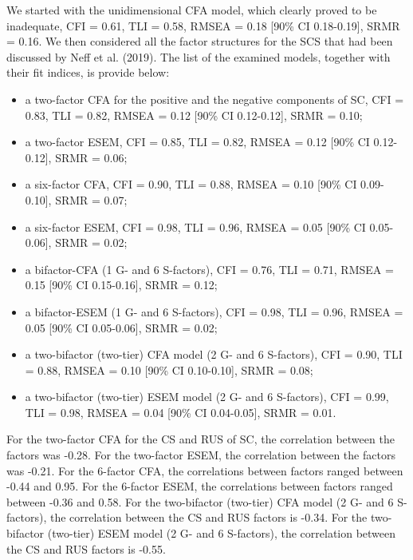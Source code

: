 \documentclass[
  english,
  man,floatsintext]{apa7}
\begin{document}
We started with the unidimensional CFA model, which clearly proved to be inadequate, CFI = 0.61, TLI = 0.58, RMSEA = 0.18 {[}90\% CI 0.18-0.19{]}, SRMR = 0.16.
We then considered all the factor structures for the SCS that had been discussed by Neff et al. (2019). The list of the examined models, together with their fit indices, is provide below:

\begin{itemize}
\item
  a two-factor CFA for the positive and the negative components of SC, CFI = 0.83, TLI = 0.82, RMSEA = 0.12 {[}90\% CI 0.12-0.12{]}, SRMR = 0.10;
\item
  a two-factor ESEM, CFI = 0.85, TLI = 0.82, RMSEA = 0.12 {[}90\% CI 0.12-0.12{]}, SRMR = 0.06;
\item
  a six-factor CFA, CFI = 0.90, TLI = 0.88, RMSEA = 0.10 {[}90\% CI 0.09-0.10{]}, SRMR = 0.07;
\item
  a six-factor ESEM, CFI = 0.98, TLI = 0.96, RMSEA = 0.05 {[}90\% CI 0.05-0.06{]}, SRMR = 0.02;
\item
  a bifactor-CFA (1 G- and 6 S-factors), CFI = 0.76, TLI = 0.71, RMSEA = 0.15 {[}90\% CI 0.15-0.16{]}, SRMR = 0.12;
\item
  a bifactor-ESEM (1 G- and 6 S-factors), CFI = 0.98, TLI = 0.96, RMSEA = 0.05 {[}90\% CI 0.05-0.06{]}, SRMR = 0.02;
\item
  a two-bifactor (two-tier) CFA model (2 G- and 6 S-factors), CFI = 0.90, TLI = 0.88, RMSEA = 0.10 {[}90\% CI 0.10-0.10{]}, SRMR = 0.08;
\item
  a two-bifactor (two-tier) ESEM model (2 G- and 6 S-factors), CFI = 0.99, TLI = 0.98, RMSEA = 0.04 {[}90\% CI 0.04-0.05{]}, SRMR = 0.01.
\end{itemize}

For the two-factor CFA for the CS and RUS of SC, the correlation between the factors was -0.28.
For the two-factor ESEM, the correlation between the factors was -0.21.
For the 6-factor CFA, the correlations between factors ranged between -0.44 and 0.95.
For the 6-factor ESEM, the correlations between factors ranged between -0.36 and 0.58.
For the two-bifactor (two-tier) CFA model (2 G- and 6 S-factors), the correlation between the CS and RUS factors is -0.34.
For the two-bifactor (two-tier) ESEM model (2 G- and 6 S-factors), the correlation between the CS and RUS factors is -0.55.
\end{document}
